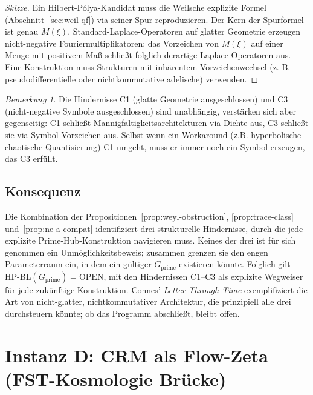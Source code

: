 \documentclass[11pt]{article}
\theoremstyle{definition}
\theoremstyle{remark}
\newtheorem{remark}[theorem]{Bemerkung}
\newcommand{\HBL}{\mathrm{HP\text{-}BL}}
\begin{document}
\begin{proof}[Skizze]
Ein Hilbert-P\'olya-Kandidat muss die Weilsche explizite Formel
(Abschnitt~\ref{sec:weil-qf}) via seiner Spur reproduzieren. Der Kern der
Spurformel ist genau $M(\xi)$. Standard-Laplace-Operatoren auf glatter Geometrie
erzeugen nicht-negative Fouriermultiplikatoren; das Vorzeichen von $M(\xi)$ auf einer
Menge mit positivem Maß schließt folglich derartige Laplace-Operatoren aus.
Eine Konstruktion muss Strukturen mit inhärentem Vorzeichenwechsel (z. B.
pseudodifferentielle oder nichtkommutative adelische) verwenden.
\end{proof}

\begin{remark}\label{rem:ne-a-connection}
Die Hindernisse C1 (glatte Geometrie ausgeschlossen) und C3 (nicht-negative
Symbole ausgeschlossen) sind unabhängig, verstärken sich aber gegenseitig: C1
schließt Mannigfaltigkeitsarchitekturen via Dichte aus, C3 schließt sie
via Symbol-Vorzeichen aus. Selbst wenn ein Workaround (z.B.
hyperbolische chaotische Quantisierung) C1 umgeht, muss er immer noch
ein Symbol erzeugen, das C3 erfüllt.
\end{remark}

\subsection{Konsequenz}

Die Kombination der Propositionen~\ref{prop:weyl-obstruction},
\ref{prop:trace-class} und~\ref{prop:ne-a-compat} identifiziert drei
strukturelle Hindernisse, durch die jede explizite Prime-Hub-Konstruktion
navigieren muss. Keines der drei ist für sich genommen ein Unmöglichkeitsbeweis;
zusammen grenzen sie den engen Parameterraum ein, in dem
ein gültiger $G_\mathrm{prime}$ existieren könnte. Folglich
gilt $\HBL(G_\mathrm{prime}) = \mathrm{OPEN}$, mit den Hindernissen C1--C3
als explizite Wegweiser für jede zukünftige Konstruktion. Connes'
\emph{Letter Through Time} \cite{Connes2026} exemplifiziert die Art von
nicht-glatter, nichtkommutativer Architektur, die prinzipiell
alle drei durchsteuern könnte; ob das Programm abschließt, bleibt offen.

\section{Instanz D: CRM als Flow-Zeta (FST-Kosmologie Brücke)}
\label{sec:crm-flow}
\end{document}
